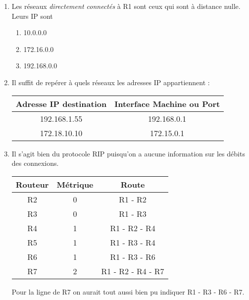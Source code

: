 \documentclass[a4paper,12pt,french]{article}
\begin{document}
\begin{enumerate}[\bfseries 1.]
\item 	 Les réseaux \textit{directement connectés }à R1 sont ceux qui sont à distance nulle. Leurs IP sont
\begin{enumerate}[--]
\item 	10.0.0.0
\item 	 172.16.0.0
\item	192.168.0.0
\end{enumerate} 
\item 		Il suffit de repérer à quels réseaux les adresses IP appartiennent :
\begin{center}
\begin{tabular}{|c|c|}
\hline
\textbf{Adresse IP destination}&\textbf{Interface Machine ou Port}\\
\hline
192.168.1.55            & 192.168.0.1\\
\hline
172.18.10.10            & 172.15.0.1 \\               
\hline
\end{tabular}
\end{center}
\item	Il s'agit bien du protocole RIP puisqu'on a aucune information sur les débits des connexions.
\begin{center}
\begin{tabular}{|c|c|c|}
\hline
\textbf{Routeur}&\textbf{Métrique}&\textbf{Route}\\
\hline
R2 & 0 & R1 - R2 \\
\hline
R3 & 0 & R1 - R3 \\
\hline
R4 & 1 & R1 - R2 - R4 \\
\hline
R5 & 1 & R1 - R3 - R4 \\
\hline
R6 & 1 & R1 - R3 - R6 \\
\hline
R7 & 2 & R1 - R2 - R4 - R7 \\
\hline
\end{tabular}
\end{center}
Pour la ligne de R7 on aurait tout aussi bien pu indiquer R1 - R3 - R6 - R7.

\end{enumerate}


\exo{}
\end{document}
